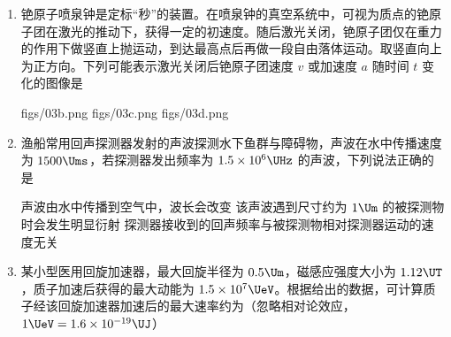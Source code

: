 \documentclass[\gkver]{gaokaozhenti}
\begin{document}
\begin{enumerate}
{故选 C。
}

\item
铯原子喷泉钟是定标“秒”的装置。在喷泉钟的真空系统中，可视为质点的铯原子团在激光的推动下，获得一定的初速度。随后激光关闭，铯原子团仅在重力的作用下做竖直上抛运动，到达最高点后再做一段自由落体运动。取竖直向上为正方向。下列可能表示激光关闭后铯原子团速度 $v$ 或加速度 $a$ 随时间 $t$ 变化的图像是

{figs/03b.png}
{figs/03c.png}
{figs/03d.png}


\item
渔船常用回声探测器发射的声波探测水下鱼群与障碍物，声波在水中传播速度为 $1500 \Ums$，若探测器发出频率为 $1.5\times10^{6} \UHz$ 的声波，下列说法正确的是

{声波由水中传播到空气中，波长会改变}
{该声波遇到尺寸约为 $1 \Um$ 的被探测物时会发生明显衍射}
{探测器接收到的回声频率与被探测物相对探测器运动的速度无关}


\item
某小型医用回旋加速器，最大回旋半径为 $0.5 \Um$，磁感应强度大小为 $1.12 \UT$，质子加速后获得的最大动能为 $1.5\times10^{7} \UeV$。根据给出的数据，可计算质子经该回旋加速器加速后的最大速率约为（忽略相对论效应，$1 \UeV = 1.6\times10^{-19} \UJ$）


\end{enumerate}
\end{document}
